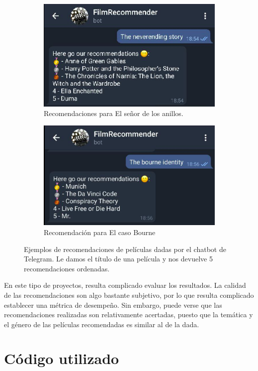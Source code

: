 \begin{figure}[H]
\begin{subfigure}{.5\textwidth}
  \centering
  \includegraphics[width=.9\linewidth]{contenido/imagenes/sc3.png}
  \caption{Recomendaciones para El señor de los anillos.}
  \label{fig:sc3}
\end{subfigure}%
\begin{subfigure}{.5\textwidth}
  \centering
  \includegraphics[width=.9\linewidth]{contenido/imagenes/sc4.png}
  \caption{Recomendación para El caso Bourne}
  \label{fig:sc4}
\end{subfigure}
\caption{Ejemplos de recomendaciones de películas dadas por el chatbot de Telegram. Le damos el título de una película y nos devuelve 5 recomendaciones ordenadas.}
\label{fig:TelegramResults}
\end{figure}

En este tipo de proyectos, resulta complicado evaluar los resultados. La calidad de las recomendaciones son algo bastante subjetivo, por lo que resulta complicado establecer una métrica de desempeño. Sin embargo, puede verse que las recomendaciones realizadas son relativamente acertadas, puesto que la temática y el género de las películas recomendadas es similar al de la dada.\\

\section{Código utilizado}

